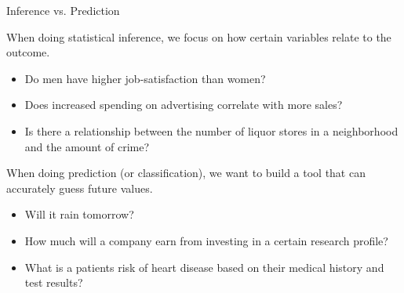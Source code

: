 \documentclass[10pt]{beamer}\usepackage[]{graphicx}\usepackage[]{color}
\begin{document}
\begin{frame}{Inference vs. Prediction}

  When doing statistical inference, we focus on how certain variables relate to
  the outcome.
  \begin{itemize}
  \item Do men have higher job-satisfaction than women?
  \item Does increased spending on advertising correlate with more sales?
  \item Is there a relationship between the number of liquor stores in a
    neighborhood and the amount of crime?
  \end{itemize}

  \vb
  \pause

  When doing prediction (or classification), we want to build a tool that can
  accurately guess future values.
  \begin{itemize}
  \item Will it rain tomorrow?
  \item How much will a company earn from investing in a certain research
    profile?
  \item What is a patients risk of heart disease based on their medical history
    and test results?
  \end{itemize}

\end{frame}



\watermarkoff %
\end{document}
